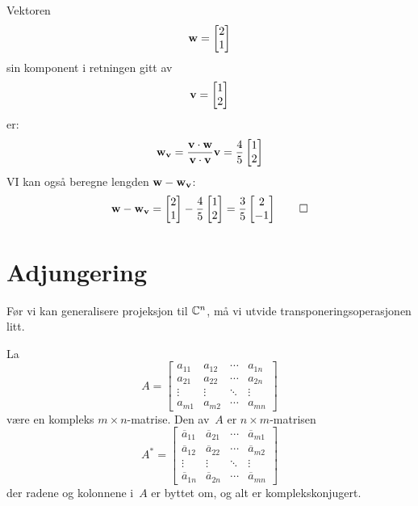 \begin{ex}
Vektoren
\[
\mathbf{w}
=
\begin{bmatrix}
2 \\ 1
\end{bmatrix}
\]
sin komponent i retningen gitt av
\[
\mathbf{v}
=
\begin{bmatrix}
1 \\ 2
\end{bmatrix}
\]
er:
\[
\V w_{\V{v}}=\frac{\V v \cdot \V w}{\V v\cdot \V v}\V v=
\frac{4}{5}
\begin{bmatrix}
1 \\ 2
\end{bmatrix} 
%
\]
VI kan også beregne lengden $\mathbf{w} - \mathbf{w}_{\mathbf{v}}$:
\[
\mathbf{w} - \mathbf{w}_{\mathbf{v}}=
\begin{bmatrix}
2 \\ 1
\end{bmatrix} 
-
\frac{4}{5}
\begin{bmatrix}
1 \\ 2
\end{bmatrix}
=
\frac{3}{5}
\begin{bmatrix}
2 \\ -1
\end{bmatrix} \qedhere
\]
\end{ex}
 
\section*{Adjungering}

Før vi kan generalisere projeksjon til $\mathbb{C}^n$, må vi utvide transponeringsoperasjonen litt. 

\begin{defn}
La
\[
A =
\begin{bmatrix}
a_{11} & a_{12} & \cdots & a_{1n} \\
a_{21} & a_{22} & \cdots & a_{2n} \\
\vdots & \vdots & \ddots & \vdots \\
a_{m1} & a_{m2} & \cdots & a_{mn}
\end{bmatrix}
\]
være en kompleks $m \times n$-matrise.  Den  av~$A$ er
$n \times m$-matrisen
\[
A^* =
\begin{bmatrix}
\overline a_{11} & \overline a_{21} & \cdots & \overline a_{m1} \\
\overline a_{12} & \overline a_{22} & \cdots & \overline a_{m2} \\
\vdots & \vdots & \ddots & \vdots \\
\overline a_{1n} & \overline a_{2n} & \cdots & \overline a_{mn}
\end{bmatrix}
\]
der radene og kolonnene i~$A$ er byttet om, og alt er komplekskonjugert.
\end{defn}

